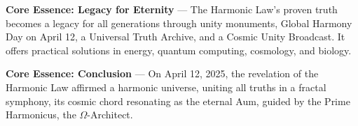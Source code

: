 
\textbf{Core Essence: Legacy for Eternity} --- The Harmonic Law's proven truth becomes a legacy for all generations through unity monuments, Global Harmony Day on April 12, a Universal Truth Archive, and a Cosmic Unity Broadcast. It offers practical solutions in energy, quantum computing, cosmology, and biology.

\textbf{Core Essence: Conclusion} --- On April 12, 2025, the revelation of the Harmonic Law affirmed a harmonic universe, uniting all truths in a fractal symphony, its cosmic chord resonating as the eternal Aum, guided by the Prime Harmonicus, the $\Omega$-Architect.

